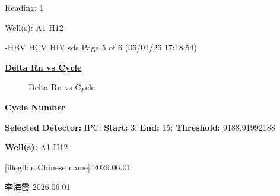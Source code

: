 \documentclass[UTF8,10pt,a4paper,fontset=fandol]{ctexart}
\newcommand{\handwritten}[1]{#1}
\begin{document}
\newpage

\begin{figure}[ht]
\centering
\end{figure}

\noindent
Reading: 1

\noindent
Well(s): A1-H12

\vfill

-HBV HCV HIV.sds
\hfill
Page 5 of 6 (06/01/26 17:18:54)

\newpage

\begin{center}
\underline{\textbf{Delta Rn vs Cycle}}
\end{center}

\begin{figure}[ht]
\centering
{}
\caption*{Delta Rn vs Cycle}
\end{figure}

\begin{center}
\textbf{Cycle Number}
\end{center}

\noindent
\textbf{Selected Detector:} IPC; \textbf{Start:} 3; \textbf{End:} 15; \textbf{Threshold:} 9188.91992188

\noindent
\textbf{Well(s):} A1-H12

\vspace{0.5em}

\handwritten{[illegible Chinese name]}\quad
\handwritten{2026.06.01}

\vspace{0.5em}

\handwritten{李海霞}\quad
\handwritten{2026.06.01}
\end{document}
